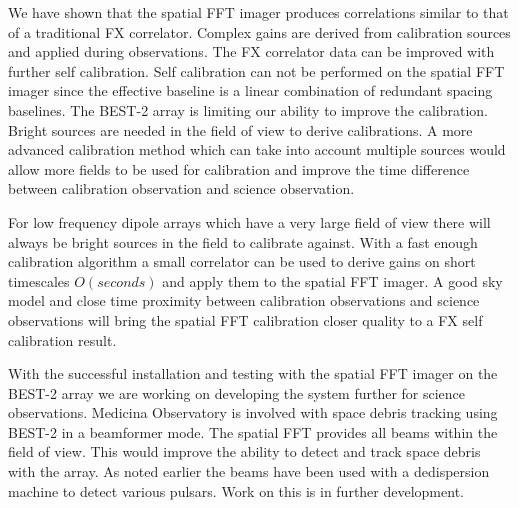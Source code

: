 \documentclass[useAMS,macros,usenatbib,onecolumn]{mn2e}
\begin{document}
We have shown that the spatial FFT imager produces correlations similar to that of a traditional FX correlator.
Complex gains are derived from calibration sources and applied during observations.
The FX correlator data can be improved with further self calibration.
Self calibration can not be performed on the spatial FFT imager since the effective baseline is a linear combination of redundant spacing baselines.
The BEST-2 array is limiting our ability to improve the calibration.
Bright sources are needed in the field of view to derive calibrations.
A more advanced calibration method which can take into account multiple sources would allow more fields to be used for calibration and improve the time difference between calibration observation and science observation.

For low frequency dipole arrays which have a very large field of view there will always be bright sources in the field to calibrate against.
With a fast enough calibration algorithm a small correlator can be used to derive gains on short timescales $O(seconds)$ and apply them to the spatial FFT imager.
A good sky model and close time proximity between calibration observations and science observations will bring the spatial FFT calibration closer quality to a FX self calibration result.

With the successful installation and testing with the spatial FFT imager on the BEST-2 array we are working on developing the system further for science observations.
Medicina Observatory is involved with space debris tracking using BEST-2 in a beamformer mode.
The spatial FFT provides all beams within the field of view.
This would improve the ability to detect and track space debris with the array.
As noted earlier the beams have been used with a dedispersion machine to detect various pulsars.
Work on this is in further development.

\end{document}
